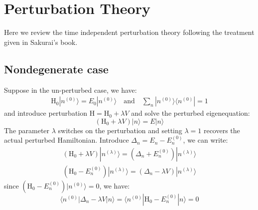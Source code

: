 \documentclass{article}
\newcommand{\huptb}{\text{H}_0}
\newcommand{\order}[2]{#1^{(#2)}}
\newcommand{\statebra}[1]{\langle #1 |}
\newcommand{\stateket}[1]{| #1 \rangle}
\begin{document}
\section{Perturbation Theory}
Here we review the time independent perturbation theory following the treatment 
given in Sakurai's book.
\subsection{Nondegenerate case}
Suppose in the un-perturbed case, we have:
\begin{gather}
    \huptb \stateket{\order{n}{0}} = E_0 \stateket{\order{n}{0}} \quad \text{and} \quad
    \sum_n \stateket{\order{n}{0}}\statebra{\order{n}{0}} = 1
\end{gather}
and introduce perturbation $\text{H} = \huptb + \lambda V$ and solve the 
perturbed eigenequation:
\begin{equation}
    (\huptb + \lambda V) \stateket{n} = E \stateket{n}
\end{equation}
The parameter $\lambda$ switches on the perturbation and setting $\lambda = 1$ 
recovers the actual perturbed Hamiltonian. 
Introduce $\Delta_n = E_n - \order{E_n}{0}$, we 
can write:
\begin{align}
    (\huptb + \lambda V) \stateket{\order{n}{\lambda}} = (\Delta_n + \order{E_n}{0}) \stateket{\order{n}{\lambda}} \\
    (\huptb - \order{E_n}{0}) \stateket{\order{n}{\lambda}} = (\Delta_n - \lambda V) \stateket{\order{n}{\lambda}}
\end{align}
since $(\huptb - \order{E_n}{0})\stateket{\order{n}{0}} = 0$, we have:
\begin{equation}
    \label{E:result1}
    \statebra{\order{n}{0}} \Delta_n - \lambda V \stateket{n}
    = \statebra{\order{n}{0}} \huptb - \order{E_n}{0} \stateket{n} 
    = 0
\end{equation} 
\end{document}
